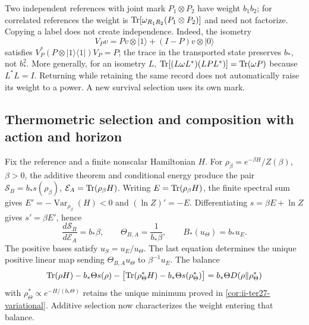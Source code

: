 Two independent references with joint mark $P_1\otimes P_2$ have weight
$b_1b_2$; for correlated references the weight is
$\operatorname{Tr}[\omega_{R_1R_2}(P_1\otimes P_2)]$ and need not factorize.
Copying a label does not create independence. Indeed, the isometry
\[
 V_Pv=Pv\otimes|1\rangle+(I-P)v\otimes|0\rangle
\]
satisfies $V_P^*(P\otimes|1\rangle\langle1|)V_P=P$; the trace in
the transported state preserves $b_*$, not $b_*^2$. More generally,
for an isometry $L$,
$\operatorname{Tr}[(L\omega L^*)(LPL^*)]=\operatorname{Tr}(\omega P)$ because $L^*L=I$.
Returning while retaining the same record does not automatically raise
its weight to a power. A new survival selection uses its own mark.

\subsection{Thermometric selection and composition with action and horizon}
\label{subsec:ii-tins-seleccion}

Fix the reference and a finite nonscalar Hamiltonian $H$. For
$\rho_\beta=e^{-\beta H}/Z(\beta)$, $\beta>0$, the additive theorem
and conditional energy produce the pair
$\mathcal S_B=b_*s(\rho_\beta)$, $\mathcal E_A=\operatorname{Tr}(\rho_\beta H)$.
Writing $E=\operatorname{Tr}(\rho_\beta H)$, the finite spectral sum gives
$E'=-\operatorname{Var}_{\rho_\beta}(H)<0$ and $(\ln Z)'=-E$.
Differentiating $s=\beta E+\ln Z$ gives $s'=\beta E'$, hence
\begin{equation}
 \frac{d\mathcal S_B}{d\mathcal E_A}=b_*\beta,\qquad
 \Theta_{B,A}=\frac1{b_*\beta},\qquad B_*(u_\Theta)=b_*u_E.
 \label{eq:ii-tins-temperature}
\end{equation}
The positive bases satisfy $u_S=u_E/u_\Theta$. The last equation
determines the unique positive linear map sending
$\Theta_{B,A}u_\Theta$ to $\beta^{-1}u_E$. The balance
\[
 \operatorname{Tr}(\rho H)-b_*\Theta s(\rho)-
 \bigl[\operatorname{Tr}(\rho_\Theta^*H)-b_*\Theta s(\rho_\Theta^*)\bigr]
 =b_*\Theta D(\rho\Vert\rho_\Theta^*)
\]
with $\rho_\Theta^*\propto e^{-H/(b_*\Theta)}$ retains the unique
minimum proved in \ref{cor:ii-ter27-variational}. Additive selection
now characterizes the weight entering that balance.

